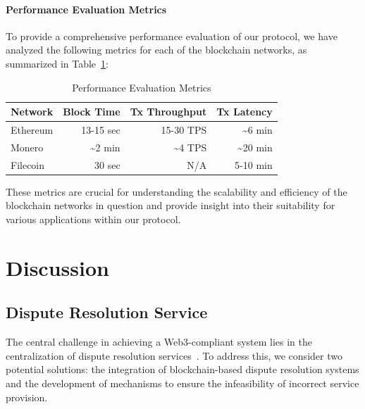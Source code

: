 \documentclass[pdftex,twocolumn,epjc3]{svjour3}
\begin{document}
\paragraph{Performance Evaluation Metrics}

To provide a comprehensive performance evaluation of our protocol, we have analyzed the following metrics for each of the blockchain networks, as summarized in Table~\ref{table:performance}:

\begin{table}[h!]
\centering
\caption{Performance Evaluation Metrics}
\label{table:performance}
\begin{tabular}{lrrr}
\hline
\textbf{Network}     & \textbf{Block Time} & \textbf{Tx Throughput} & \textbf{Tx Latency} \\ \hline
Ethereum             & 13-15 sec       & 15-30 TPS                       & \textasciitilde{}6 min      \\
Monero               & \textasciitilde{}2 min & \textasciitilde{}4 TPS             & \textasciitilde{}20 min \\
Filecoin             & 30 sec & N/A\footnotemark{}            & 5-10 min  \\ 
\hline
\end{tabular}
\end{table}



These metrics are crucial for understanding the scalability and efficiency of the blockchain networks in question and provide insight into their suitability for various applications within our protocol.
\section{Discussion}
\label{sec:discussion}

\subsection{Dispute Resolution Service}\label{sec:decentralised-justice}

\begin{sloppypar}
The central challenge in achieving a Web3-compliant system lies in the centralization of dispute resolution services~\cite{ethereumWhatWeb3Why2023}. To address this, we consider two potential solutions: the integration of blockchain-based dispute resolution systems and the development of mechanisms to ensure the infeasibility of incorrect service provision.
\end{sloppypar}
\end{document}

